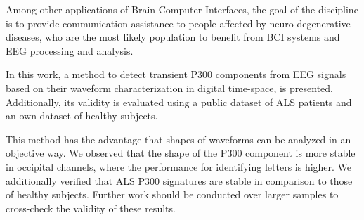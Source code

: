 \documentclass[utf8]{frontiersSCNS} %
\begin{document}




Among other applications of Brain Computer Interfaces, the goal of the discipline is to provide communication assistance to people affected by neuro-degenerative diseases, who are the most likely population to benefit from BCI systems and EEG processing and analysis.

In this work, a method to detect transient P300 components from EEG signals based on their waveform characterization in digital time-space, is presented.  Additionally, its validity is evaluated using a public dataset of ALS patients and an own dataset of healthy subjects. 


This method has the advantage that shapes of waveforms can be analyzed in an objective way.  We observed that the shape of the P300 component is more stable in occipital channels, where the performance for identifying letters is higher.   We additionally verified that ALS P300 signatures are stable in comparison to those of healthy subjects.  Further work should be conducted over larger samples to cross-check the validity of these results.
\end{document}
